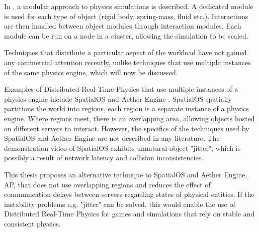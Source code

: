 
In \cite{allard2006distributed}, a modular approach to physics simulations is described. A dedicated module is used for each type of object (rigid body, spring-mass, fluid etc.). Interactions are then handled between object modules through interaction modules. Each module can be run on a node in a cluster, allowing the simulation to be scaled.

Techniques that distribute a particular aspect of the workload have not gained any commercial attention recently, unlike techniques that use multiple instances of the same physics engine, which will now be discussed.

Examples of Distributed Real-Time Physics that use multiple instances of a physics engine include SpatialOS \cite{SpatialOS} and Aether Engine \cite{AetherEngine}. SpatialOS spatially partitions the world into regions, each region is a separate instance of a physics engine. Where regions meet, there is an overlapping area, allowing objects hosted on different servers to interact. However, the specifics of the techniques used by SpatialOS and Aether Engine are not described in any literature. The demonstration video of SpatialOS exhibits unnatural object "jitter", which is possibly a result of network latency and collision inconsistencies.

This thesis proposes an alternative technique to SpatialOS and Aether Engine, AP, that does not use overlapping regions and reduces the effect of communication delays between servers regarding states of physical entities. If the instability problems e.g. "jitter" can be solved, this would enable the use of Distributed Real-Time Physics for games and simulations that rely on stable and consistent physics.








